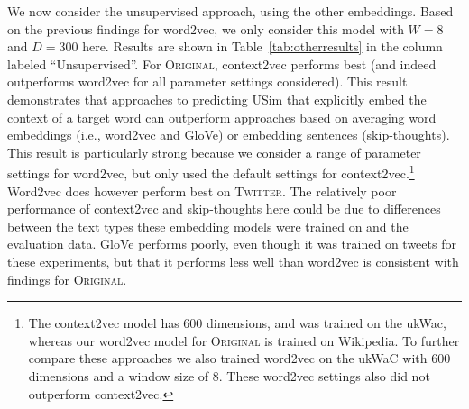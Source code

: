 \documentclass[11pt]{article}
\newcommand\original{\textsc{Original}\xspace}
\newcommand\twitter{\textsc{Twitter}\xspace}
\newcommand\glove{GloVe\xspace}
\newcommand{\tabref}[1]{Table~\ref{#1}}
\begin{document}
We now consider the unsupervised approach, using the other
embeddings. Based on the previous findings for word2vec, we only
consider this model with $W=8$ and $D=300$ here. Results are shown in
\tabref{tab:otherresults} in the column labeled ``Unsupervised''. For
\original, context2vec performs best (and indeed outperforms word2vec
for all parameter settings considered). This result demonstrates that
approaches to predicting USim that explicitly embed the context of a
target word can outperform approaches based on averaging word
embeddings (i.e., word2vec and GloVe) or embedding sentences
(skip-thoughts). This result is particularly strong because we
consider a range of parameter settings for word2vec, but only used the
default settings for context2vec.\footnote{The context2vec model has
  600 dimensions, and was trained on the ukWac, whereas our word2vec
  model for \original is trained on Wikipedia. To further compare
  these approaches we also trained word2vec on the ukWaC with 600
  dimensions and a window size of 8. These word2vec settings also did
  not outperform context2vec.}  Word2vec does however perform best on
\twitter.  The relatively poor performance of context2vec and
skip-thoughts here could be due to differences between the text types
these embedding models were trained on and the evaluation data.
\glove performs poorly, even though it was trained on tweets for these
experiments, but that it performs less well than word2vec is
consistent with findings for \original.
\end{document}
